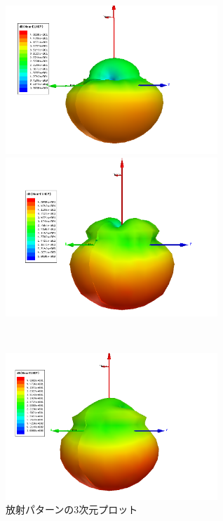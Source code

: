 \documentclass[11pt,a4paper,uplatex,draft]{ujarticle}
\begin{document}
  \clearpage
  \begin{figure}[tbp]
    \begin{minipage}[b]{0.49\textwidth}
      \centering
      \includegraphics[keepaspectratio, width=80mm]{Images/near_E_2GHz.png}
    \end{minipage}
    \begin{minipage}[b]{0.49\textwidth}
      \centering
      \includegraphics[keepaspectratio, width=80mm]{Images/near_E_5GHz.png}
    \end{minipage}\\
    \begin{minipage}[b]{0.49\textwidth}
      \centering
      \includegraphics[keepaspectratio, width=80mm]{Images/near_E_10GHz.png}
    \end{minipage}
    \caption{放射パターンの3次元プロット}\label{fig:radiation_pattern_3D}
  \end{figure}
\end{document}
